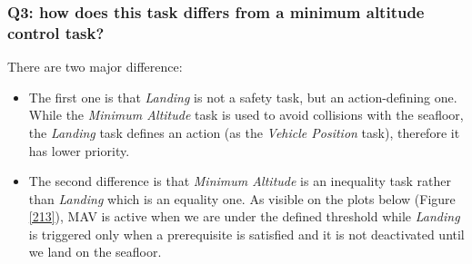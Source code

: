 \documentclass{article}
\begin{document}
\subsubsection{Q3: how does this task differs from a minimum altitude control task?}
There are two major difference:
\begin{itemize} 
\item The first one is that \textit{Landing} is not a safety task, but an action-defining one. While the \textit{Minimum Altitude} task is used to avoid collisions with the seafloor, the \textit{Landing} task defines an action (as the \textit{Vehicle Position} task), therefore it has lower priority.\\
\item The second difference is that \textit{Minimum Altitude} is an inequality task rather than \textit{Landing} which is an equality one. As visible on the plots below (Figure \ref{213}), MAV is active when we are under the defined threshold while \textit{Landing} is triggered only when a prerequisite is satisfied and it is not deactivated until we land on the seafloor.
\end{itemize}
\end{document}
